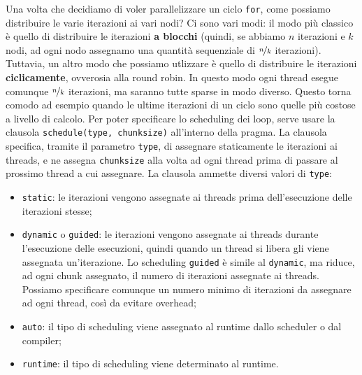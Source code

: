 Una volta che decidiamo di voler parallelizzare un ciclo \verb|for|, come possiamo distribuire le varie iterazioni ai vari nodi? Ci sono vari modi: il modo più classico è quello di distribuire le iterazioni \textbf{a blocchi} (quindi, se abbiamo $n$ iterazioni e $k$ nodi, ad ogni nodo assegnamo una quantità sequenziale di $\nicefrac{n}{k}$ iterazioni). Tuttavia, un altro modo che possiamo utlizzare è quello di distribuire le iterazioni \textbf{ciclicamente}, ovverosia alla round robin. In questo modo ogni thread esegue comunque $\nicefrac{n}{k}$ iterazioni, ma saranno tutte sparse in modo diverso. Questo torna comodo ad esempio quando le ultime iterazioni di un ciclo sono quelle più costose a livello di calcolo.
\nl
Per poter specificare lo scheduling dei loop, serve usare la clausola \verb|schedule(type, chunksize)| all'interno della pragma. La clausola specifica, tramite il parametro \verb|type|, di assegnare staticamente le iterazioni ai threads, e ne assegna \verb|chunksize| alla volta ad ogni thread prima di passare al prossimo thread a cui assegnare.
\nl
La clausola ammette diversi valori di \verb|type|:
\begin{itemize}
    \item \verb|static|: le iterazioni vengono assegnate ai threads prima dell'esecuzione delle iterazioni stesse;
    \item \verb|dynamic| o \verb|guided|: le iterazioni vengono assegnate ai threads durante l'esecuzione delle esecuzioni, quindi quando un thread si libera gli viene assegnata un'iterazione. Lo scheduling \verb|guided| è simile al \verb|dynamic|, ma riduce, ad ogni chunk assegnato, il numero di iterazioni assegnate ai threads. Possiamo specificare comunque un numero minimo di iterazioni da assegnare ad ogni thread, così da evitare overhead;
    \item \verb|auto|: il tipo di scheduling viene assegnato al runtime dallo scheduler o dal compiler;
    \item \verb|runtime|: il tipo di scheduling viene determinato al runtime.
\end{itemize}


